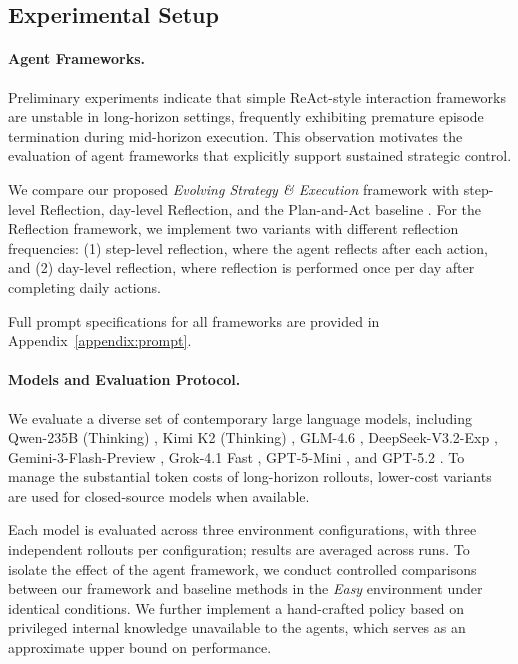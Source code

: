 
\subsection{Experimental Setup}

\paragraph{Agent Frameworks.}

Preliminary experiments indicate that simple ReAct-style interaction frameworks are unstable in long-horizon settings, frequently exhibiting premature episode termination during mid-horizon execution. This observation motivates the evaluation of agent frameworks that explicitly support sustained strategic control.

We compare our proposed \textit{Evolving Strategy \& Execution} framework with step-level Reflection, day-level Reflection, and the Plan-and-Act baseline \citep{reflection, 2025planandact}. For the Reflection framework, we implement two variants with different reflection frequencies: (1) step-level reflection, where the agent reflects after each action, and (2) day-level reflection, where reflection is performed once per day after completing daily actions.

Full prompt specifications for all frameworks are provided in Appendix~\ref{appendix:prompt}.

\paragraph{Models and Evaluation Protocol.}

We evaluate a diverse set of contemporary large language models, including Qwen-235B (Thinking) \citep{qwen3technicalreport}, Kimi K2 (Thinking) \citep{kimiteam2025kimik2openagentic}, GLM-4.6 \citep{glm4_5}, DeepSeek-V3.2-Exp \citep{deepseekai2025deepseekv32pushingfrontieropen}, Gemini-3-Flash-Preview \citep{gemini3flashpreview}, Grok-4.1 Fast \citep{xai_grok41fast}, GPT-5-Mini \citep{openai_gpt5mini2025}, and GPT-5.2 \citep{openai_gpt52}. To manage the substantial token costs of long-horizon rollouts, lower-cost variants are used for closed-source models when available.

Each model is evaluated across three environment configurations, with three independent rollouts per configuration; results are averaged across runs. To isolate the effect of the agent framework, we conduct controlled comparisons between our framework and baseline methods in the \textit{Easy} environment under identical conditions. We further implement a hand-crafted policy based on privileged internal knowledge unavailable to the agents, which serves as an approximate upper bound on performance.